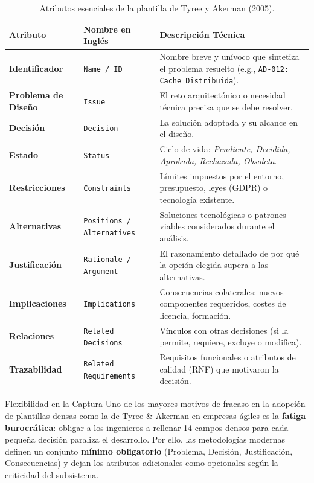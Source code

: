 \begin{table}[htbp]
\centering
\small
\begin{tabularx}{\textwidth}{l p{4cm} X}
\toprule
\textbf{Atributo} & \textbf{Nombre en Inglés} & \textbf{Descripción Técnica} \\
\midrule
\textbf{Identificador} & \texttt{Name / ID} & Nombre breve y unívoco que sintetiza el problema resuelto (e.g., \texttt{AD-012: Cache Distribuida}). \\
\addlinespace
\textbf{Problema de Diseño} & \texttt{Issue} & El reto arquitectónico o necesidad técnica precisa que se debe resolver. \\
\addlinespace
\textbf{Decisión} & \texttt{Decision} & La solución adoptada y su alcance en el diseño. \\
\addlinespace
\textbf{Estado} & \texttt{Status} & Ciclo de vida: \emph{Pendiente, Decidida, Aprobada, Rechazada, Obsoleta}. \\
\addlinespace
\textbf{Restricciones} & \texttt{Constraints} & Límites impuestos por el entorno, presupuesto, leyes (GDPR) o tecnología existente. \\
\addlinespace
\textbf{Alternativas} & \texttt{Positions / Alternatives} & Soluciones tecnológicas o patrones viables considerados durante el análisis. \\
\addlinespace
\textbf{Justificación} & \texttt{Rationale / Argument} & El razonamiento detallado de por qué la opción elegida supera a las alternativas. \\
\addlinespace
\textbf{Implicaciones} & \texttt{Implications} & Consecuencias colaterales: nuevos componentes requeridos, costes de licencia, formación. \\
\addlinespace
\textbf{Relaciones} & \texttt{Related Decisions} & Vínculos con otras decisiones (si la permite, requiere, excluye o modifica). \\
\addlinespace
\textbf{Trazabilidad} & \texttt{Related Requirements} & Requisitos funcionales o atributos de calidad (RNF) que motivaron la decisión. \\
\bottomrule
\end{tabularx}
\caption{Atributos esenciales de la plantilla de Tyree y Akerman (2005).}
\label{tab:tyree-akerman}
\end{table}

\begin{importante}{Flexibilidad en la Captura}
Uno de los mayores motivos de fracaso en la adopción de plantillas densas como la de Tyree \& Akerman en empresas ágiles es la \textbf{fatiga burocrática}: obligar a los ingenieros a rellenar 14 campos densos para cada pequeña decisión paraliza el desarrollo. Por ello, las metodologías modernas definen un conjunto \textbf{mínimo obligatorio} (Problema, Decisión, Justificación, Consecuencias) y dejan los atributos adicionales como opcionales según la criticidad del subsistema.
\end{importante}

